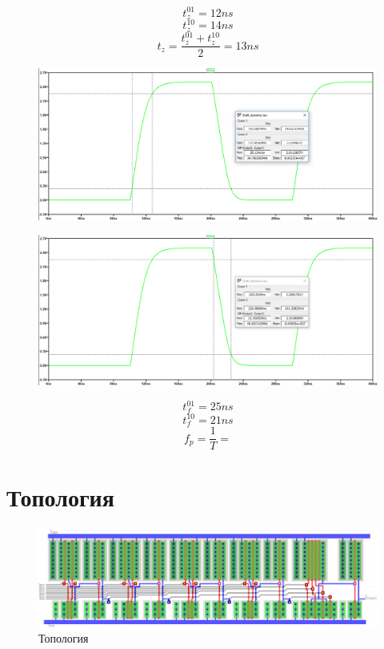 \documentclass[a4paper,14pt]{article}
\begin{document}
$$t_{z}^{01} = 12ns$$
$$t_{z}^{10} = 14ns$$
$$t_{z} = \dfrac{t_{z}^{01} + t_{z}^{10}}{2} = 13ns$$

\begin{figure}[H]
	\centering
	\includegraphics[width=\linewidth]{image/dyn_opt_f01}
	\caption{}
	\label{fig:dynoptf01}
\end{figure}

\begin{figure}[H]
	\centering
	\includegraphics[width=\linewidth]{image/dyn_opt_f10}
	\caption{}
	\label{fig:dynoptf10}
\end{figure}

$$t_{f}^{01} = 25ns$$
$$t_{f}^{10} = 21ns$$
$$f_{p} = \dfrac{1}{T} = $$




\section{Топология}

\begin{landscape}
\begin{figure}[H]
	\centering		
	\includegraphics[width=\linewidth]{image/ledit_schema}
	\caption{Топология}\label{img:ledit_schema}
\end{figure}
\end{landscape}
\end{document}
